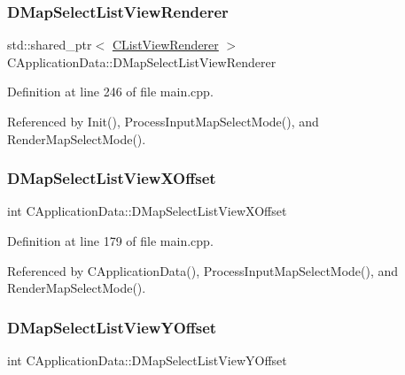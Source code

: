 \subsubsection{\texorpdfstring{D\+Map\+Select\+List\+View\+Renderer}{DMapSelectListViewRenderer}}
{\footnotesize\ttfamily std\+::shared\+\_\+ptr$<$ \hyperlink{classCListViewRenderer}{C\+List\+View\+Renderer} $>$ C\+Application\+Data\+::\+D\+Map\+Select\+List\+View\+Renderer\hspace{0.3cm}{\ttfamily [protected]}}



Definition at line 246 of file main.\+cpp.



Referenced by Init(), Process\+Input\+Map\+Select\+Mode(), and Render\+Map\+Select\+Mode().

\hypertarget{classCApplicationData_aa5a89b442e384acdf1c2aefc7ce4233b}{}\label{classCApplicationData_aa5a89b442e384acdf1c2aefc7ce4233b} 
\subsubsection{\texorpdfstring{D\+Map\+Select\+List\+View\+X\+Offset}{DMapSelectListViewXOffset}}
{\footnotesize\ttfamily int C\+Application\+Data\+::\+D\+Map\+Select\+List\+View\+X\+Offset\hspace{0.3cm}{\ttfamily [protected]}}



Definition at line 179 of file main.\+cpp.



Referenced by C\+Application\+Data(), Process\+Input\+Map\+Select\+Mode(), and Render\+Map\+Select\+Mode().

\hypertarget{classCApplicationData_ae1a8eb3fff3cf5bc236564925bec1c8c}{}\label{classCApplicationData_ae1a8eb3fff3cf5bc236564925bec1c8c} 
\subsubsection{\texorpdfstring{D\+Map\+Select\+List\+View\+Y\+Offset}{DMapSelectListViewYOffset}}
{\footnotesize\ttfamily int C\+Application\+Data\+::\+D\+Map\+Select\+List\+View\+Y\+Offset\hspace{0.3cm}{\ttfamily [protected]}}



